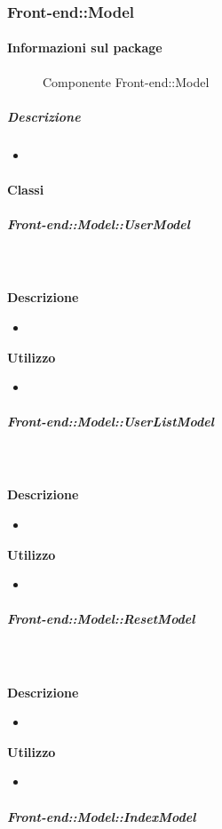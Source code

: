   \subsubsection{Front-end::Model}
  \paragraph{Informazioni sul package} 

    \begin{figure}[H] 
      \begin{center} 
        \caption{Componente Front-end::Model}
      \end{center}  
    \end{figure} 

  \subparagraph{Descrizione} 
    \begin{itemize}
    \item[] 
    \end{itemize} 
    \paragraph{Classi}
      \subparagraph{Front-end::Model::UserModel}
        
        \textbf{\\ \\ Descrizione} 
          \begin{itemize}
            \item[] 
          \end{itemize}      
        \textbf{Utilizzo}  
          \begin{itemize}
            \item[] 
          \end{itemize}
      \subparagraph{Front-end::Model::UserListModel}
        
        \textbf{\\ \\ Descrizione} 
          \begin{itemize}
            \item[] 
          \end{itemize}      
        \textbf{Utilizzo}  
          \begin{itemize}
            \item[] 
          \end{itemize}
      \subparagraph{Front-end::Model::ResetModel}
        
        \textbf{\\ \\ Descrizione} 
          \begin{itemize}
            \item[] 
          \end{itemize}      
        \textbf{Utilizzo}  
          \begin{itemize}
            \item[] 
          \end{itemize}
      \subparagraph{Front-end::Model::IndexModel}
        
